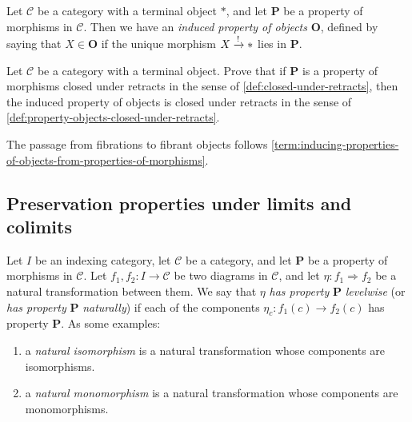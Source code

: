 \begin{terminology}\label{term:inducing-properties-of-objects-from-properties-of-morphisms} Let $\mathscr{C}$ be a category with a terminal object $\ast$, and let \textbf{P} be a property of morphisms in $\mathscr{C}$. Then we have an \textit{induced property of objects} \textbf{O}, defined by saying that $X\in \mathbf{O}$ if the unique morphism $X \xrightarrow{!} \ast$ lies in \textbf{P}.
\end{terminology}

\begin{exercise} Let $\mathscr{C}$ be a category with a terminal object. Prove that if \textbf{P} is a property of morphisms closed under retracts in the sense of \autoref{def:closed-under-retracts}, then the induced property of objects is closed under retracts in the sense of \autoref{def:property-objects-closed-under-retracts}.
\end{exercise}

\begin{remark} The passage from fibrations to fibrant objects follows \autoref{term:inducing-properties-of-objects-from-properties-of-morphisms}.
\end{remark}






\subsection{Preservation properties under limits and colimits}

\begin{definition}\label{def:naturally-P} Let $I$ be an indexing category, let $\mathscr{C}$ be a category, and let \textbf{P} be a property of morphisms in $\mathscr{C}$. Let $f_1, f_2 : I \to \mathscr{C}$ be two diagrams in $\mathscr{C}$, and let $\eta: f_1 \Rightarrow f_2$ be a natural transformation between them. We say that $\eta$ \textit{has property} \textbf{P} \textit{levelwise} (or \textit{has property} \textbf{P} \textit{naturally}) if each of the components $\eta_c : f_1(c) \to f_2(c)$ has property \textbf{P}. As some examples:
\begin{enumerate}
    \item a \textit{natural isomorphism} is a natural transformation whose components are isomorphisms.
    \item a \textit{natural monomorphism} is a natural transformation whose components are monomorphisms.
\end{enumerate}
\end{definition}



